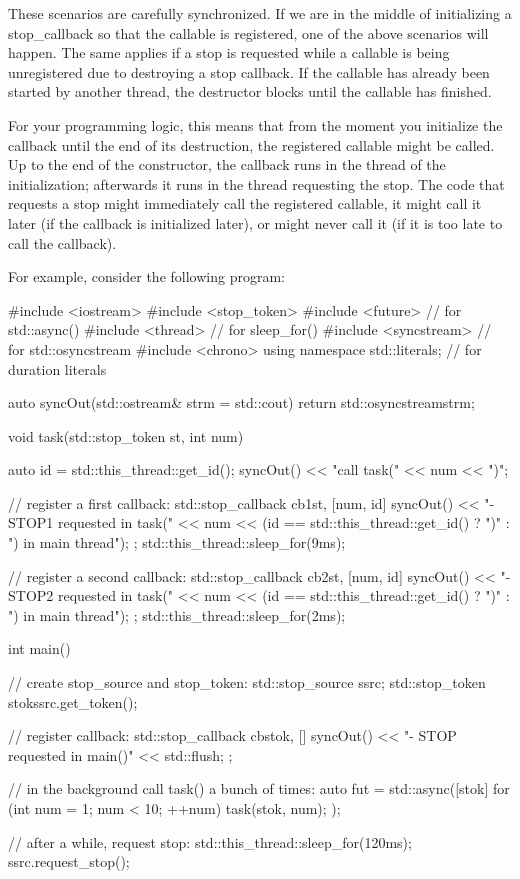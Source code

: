 These scenarios are carefully synchronized. If we are in the middle of initializing a stop\_callback so that the callable is registered, one of the above scenarios will happen. The same applies if a stop is requested while a callable is being unregistered due to destroying a stop callback. If the callable has already been started by another thread, the destructor blocks until the callable has finished.

For your programming logic, this means that from the moment you initialize the callback until the end of its destruction, the registered callable might be called. Up to the end of the constructor, the callback runs in the thread of the initialization; afterwards it runs in the thread requesting the stop. The code that requests a stop might immediately call the registered callable, it might call it later (if the callback is initialized later), or might never call it (if it is too late to call the callback).

For example, consider the following program:


\begin{cpp}
#include <iostream>
#include <stop_token>
#include <future> // for std::async()
#include <thread> // for sleep_for()
#include <syncstream> // for std::osyncstream
#include <chrono>
using namespace std::literals; // for duration literals

auto syncOut(std::ostream& strm = std::cout) {
	return std::osyncstream{strm};
}

void task(std::stop_token st, int num)
{
	auto id = std::this_thread::get_id();
	syncOut() << "call task(" << num << ")\n";
	
	// register a first callback:
	std::stop_callback cb1{st, [num, id]{
		syncOut() << "- STOP1 requested in task(" << num
			<< (id == std::this_thread::get_id() ? ")\n"
												: ") in main thread\n");
	}};
	std::this_thread::sleep_for(9ms);
	
	// register a second callback:
	std::stop_callback cb2{st, [num, id]{
		syncOut() << "- STOP2 requested in task(" << num
			<< (id == std::this_thread::get_id() ? ")\n"
												: ") in main thread\n");
	}};
	std::this_thread::sleep_for(2ms);
}
	
int main()
{
	// create stop_source and stop_token:
	std::stop_source ssrc;
	std::stop_token stok{ssrc.get_token()};
	
	// register callback:
	std::stop_callback cb{stok, []{
			syncOut() << "- STOP requested in main()\n" << std::flush;
	}};

	// in the background call task() a bunch of times:
	auto fut = std::async([stok] {
							for (int num = 1; num < 10; ++num) {
								task(stok, num);
							}
						});
	
	// after a while, request stop:
	std::this_thread::sleep_for(120ms);
	ssrc.request_stop();
}
\end{cpp}

